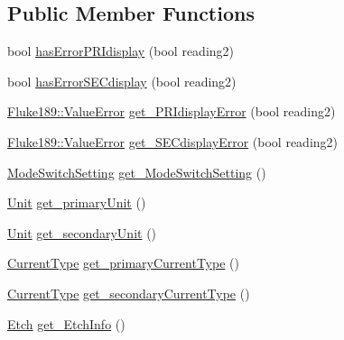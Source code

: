 \subsection*{Public Member Functions}
\begin{DoxyCompactItemize}
\item 
bool \hyperlink{classFluke_1_1Fluke189DataResponseAnalyzerWrapperQD0_aeffd54445d733f8b149c5918589e5b9e}{hasErrorPRIdisplay} (bool reading2)
\item 
bool \hyperlink{classFluke_1_1Fluke189DataResponseAnalyzerWrapperQD0_a97829a1943b858fd09c4fef1d6d61420}{hasErrorSECdisplay} (bool reading2)
\item 
\hyperlink{classFluke_1_1Fluke189_a5dc0eaffde0a29a64cbcbd50d4178491}{Fluke189::ValueError} \hyperlink{classFluke_1_1Fluke189DataResponseAnalyzerWrapperQD0_a4a3343d00db4cda2bf021074f2cfdadc}{get\_\-PRIdisplayError} (bool reading2)
\item 
\hyperlink{classFluke_1_1Fluke189_a5dc0eaffde0a29a64cbcbd50d4178491}{Fluke189::ValueError} \hyperlink{classFluke_1_1Fluke189DataResponseAnalyzerWrapperQD0_a72e91f8c908b7fa8ce541308a53ff696}{get\_\-SECdisplayError} (bool reading2)
\item 
\hyperlink{classFluke_1_1Fluke189DataResponseAnalyzerWrapper_a2ec2700a6086ae0ebd9601fe0c0f957a}{ModeSwitchSetting} \hyperlink{classFluke_1_1Fluke189DataResponseAnalyzerWrapperQD0_ad28a17399ffe6a926990aafd5a1891d3}{get\_\-ModeSwitchSetting} ()
\item 
\hyperlink{classFluke_1_1Fluke189DataResponseAnalyzerWrapper_ab8e5f2306e4d2ad3d741d273793aaed1}{Unit} \hyperlink{classFluke_1_1Fluke189DataResponseAnalyzerWrapperQD0_af71dd62d9f81866ad3cb96c580754329}{get\_\-primaryUnit} ()
\item 
\hyperlink{classFluke_1_1Fluke189DataResponseAnalyzerWrapper_ab8e5f2306e4d2ad3d741d273793aaed1}{Unit} \hyperlink{classFluke_1_1Fluke189DataResponseAnalyzerWrapperQD0_a3f1bdb92d10f341c8b22fa8ee95600b5}{get\_\-secondaryUnit} ()
\item 
\hyperlink{classFluke_1_1Fluke189DataResponseAnalyzerWrapper_afef24496da239e3613c40ad3582d7adc}{CurrentType} \hyperlink{classFluke_1_1Fluke189DataResponseAnalyzerWrapperQD0_acffb9af55e2d690060ef210977c3c933}{get\_\-primaryCurrentType} ()
\item 
\hyperlink{classFluke_1_1Fluke189DataResponseAnalyzerWrapper_afef24496da239e3613c40ad3582d7adc}{CurrentType} \hyperlink{classFluke_1_1Fluke189DataResponseAnalyzerWrapperQD0_aa46ac22750b412df37ae24db84fab138}{get\_\-secondaryCurrentType} ()
\item 
\hyperlink{classFluke_1_1Fluke189DataResponseAnalyzerWrapper_ada71f6ab32a7b0eb40bb0ed96d7053bc}{Etch} \hyperlink{classFluke_1_1Fluke189DataResponseAnalyzerWrapperQD0_a8a50c55ebd21461e4c934a1eb4b07641}{get\_\-EtchInfo} ()
\end{DoxyCompactItemize}
